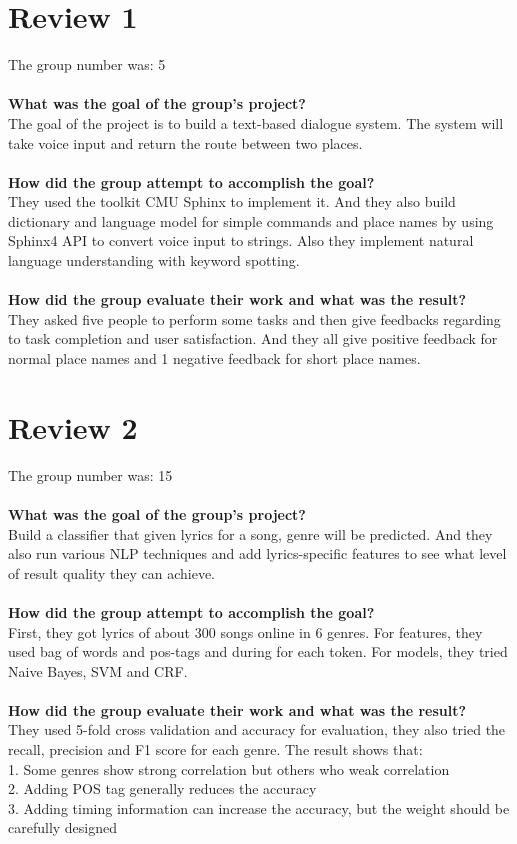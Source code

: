 \documentclass[paper=a4, fontsize=11pt]{scrartcl} %
\numberwithin{equation}{section} %
\numberwithin{figure}{section} %
\numberwithin{table}{section} %
\begin{document}
\section{Review 1}
{ The group number was: 5} \\
\ \\
{\bf What was the goal of the group's project?} \\
The goal of the project is to build a text-based dialogue system. The system will take voice input and return the route between two places.\\
\ \\
{\bf How did the group attempt to accomplish the goal?}\\
They used the toolkit CMU Sphinx to implement it. And they also build dictionary and language model for simple commands and place names by using Sphinx4 API to convert voice input to strings. Also they implement natural language understanding with keyword spotting.\\
\ \\
{\bf How did the group evaluate their work and what was the result?}\\
They asked five people to perform some tasks and then give feedbacks regarding to task completion and user satisfaction. And they all give positive feedback for normal place names and 1 negative feedback for short place names.

\section{Review 2}
{The group number was: 15} \\
\ \\
{\bf What was the goal of the group's project?} \\
Build a classifier that given lyrics for a song, genre will be predicted. And they also run various NLP techniques and add
lyrics-specific features to see what level of result quality they can achieve.\\
\ \\
{\bf How did the group attempt to accomplish the goal?}\\
First, they got lyrics of about 300 songs online in 6 genres. For features, they used bag of words and pos-tags and during for each token. For models, 
they tried Naive Bayes, SVM and CRF.\\
\ \\
{\bf How did the group evaluate their work and what was the result?}\\
They used 5-fold cross validation and accuracy for evaluation, they also tried the recall, precision and F1 score for each genre. The result shows
that: \\
1. Some genres show strong correlation but others who weak correlation\\
2. Adding POS tag generally reduces the accuracy\\
3. Adding timing information can increase the accuracy, but the weight should be carefully designed
\end{document}
